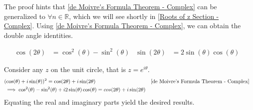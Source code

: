 \documentclass[12pt, english]{book}
\makeatletter
\renewenvironment{proof}[1][\proofname]{\par
	\pushQED{\qed}%
	\normalfont \topsep6\p@\@plus6\p@\relax
	\list{}{%
		\settowidth{\leftmargin}{\itshape\proofname:\hskip\labelsep}%
		\setlength{\labelwidth}{0pt}%
		\setlength{\itemindent}{-\leftmargin}%
	}%
	\item[\hskip\labelsep\itshape#1\@addpunct{:}]\ignorespaces
}{%
	\popQED\endlist\@endpefalse
}
\makeatother
\begin{document}
	The proof hints that \cref{de Moivre's Formula Theorem - Complex} can be generalized to $\forall n \in \mathbb{R}$, which we will see shortly in \cref{Roots of z Section - Complex}. Using \cref{de Moivre's Formula Theorem - Complex}, we can obtain the double angle identities.
	
	\begin{corollary}
		\begin{align*}
			\cos(2 \theta) &= \cos^2(\theta) - \sin^2(\theta) 
				& \sin(2\theta) &= 2\sin(\theta)\cos(\theta)
		\end{align*}
	\end{corollary}
	\begin{proof}
		Consider any $z$ on the unit circle, that is $z=e^{i\theta}$.
		\begin{align*}
			&(\cos(\theta) + i \sin(\theta))^2 = \cos(2\theta) + i \sin(2\theta)
				&\text{\Cref{de Moivre's Formula Theorem - Complex}} \\
			&\implies \cos^2(\theta) - \sin^2(\theta) + i2\sin(\theta)\cos(\theta) = cos(2\theta) + i\sin(2\theta) 
		\end{align*}
		Equating the real and imaginary parts yield the desired results. 
	\end{proof}
\end{document}
